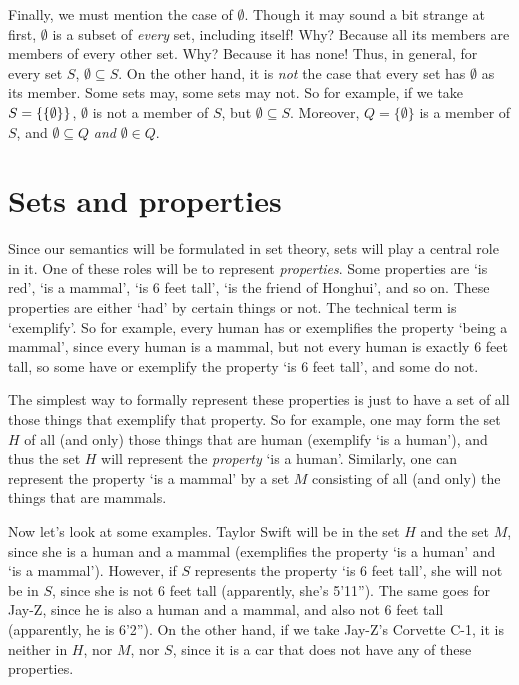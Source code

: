 Finally, we must mention the case of $\emptyset$. Though it may sound a bit strange at first, $\emptyset$ is a subset of \textit{every} set, including itself! Why? Because all its members are members of every other set. Why? Because it has none! Thus, in general, for every set $S$, $\emptyset \subseteq S$. On the other hand, it is \textit{not} the case that every set has $\emptyset$ as its member. Some sets may, some sets may not. So for example, if we take $S=\{\{\emptyset\}\}$, $\emptyset$ is not a member of $S$, but $\emptyset \subseteq S$. Moreover, $Q=\{\emptyset\}$ is a member of $S$, and $\emptyset \subseteq Q$ \textit{and} $\emptyset \in Q$. 

\section{Sets and properties}

Since our semantics will be formulated in set theory, sets will play a central role in it. One of these roles will be to represent \textit{properties}. Some properties are `is red', `is a mammal', `is 6 feet tall', `is the friend of Honghui', and so on. These properties are either `had' by certain things or not. The technical term is `exemplify'. So for example, every human has or exemplifies the property `being a mammal', since every human is a mammal, but not every human is exactly 6 feet tall, so some have or exemplify the property `is 6 feet tall', and some do not. 

The simplest way to formally represent these properties is just to have a set of all those things that exemplify that property. So for example, one may form the set $H$ of all (and only) those things that are human (exemplify `is a human'), and thus the set $H$ will represent the \textit{property} `is a human'. Similarly, one can represent the property `is a mammal' by a set $M$ consisting of all (and only) the things that are mammals. 

Now let's look at some examples. Taylor Swift will be in the set $H$ and the set $M$, since she is a human and a mammal (exemplifies the property `is a human' and `is a mammal'). However, if $S$ represents the property `is 6 feet tall', she will not be in $S$, since she is not 6 feet tall (apparently, she's 5'11''). The same goes for Jay-Z, since he is also a human and a mammal, and also not 6 feet tall (apparently, he is 6'2''). On the other hand, if we take Jay-Z's Corvette C-1, it is neither in $H$, nor $M$, nor $S$, since it is a car that does not have any of these properties. 

